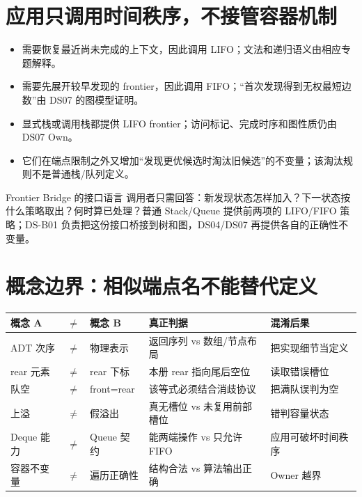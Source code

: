 \documentclass[UTF8,fontset=none,11pt,a4paper]{ctexart}
\begin{document}
\section{应用只调用时间秩序，不接管容器机制}
\begin{itemize}
\item {}需要恢复最近尚未完成的上下文，因此调用 LIFO；文法和递归语义由相应专题解释。
\item {}需要先展开较早发现的 frontier，因此调用 FIFO；“首次发现得到无权最短边数”由 DS07 的图模型证明。
\item {}显式栈或调用栈都提供 LIFO frontier；访问标记、完成时序和图性质仍由 DS07 Own。
\item {}它们在端点限制之外又增加“发现更优候选时淘汰旧候选”的不变量；该淘汰规则不是普通栈/队列定义。
\end{itemize}

\begin{methodbox}{Frontier Bridge 的接口语言}
调用者只需回答：新发现状态怎样加入？下一状态按什么策略取出？何时算已处理？普通 Stack/Queue 提供前两项的 LIFO/FIFO 策略；DS-B01 负责把这份接口桥接到树和图，DS04/DS07 再提供各自的正确性不变量。
\end{methodbox}

\section{概念边界：相似端点名不能替代定义}
\begin{center}\small
\begin{tabularx}{\linewidth}{L{1.8cm}C{0.35cm}L{1.8cm}YY}
\toprule
概念 A & $\neq$ & 概念 B & 真正判据 & 混淆后果\\
\midrule
ADT 次序 & $\neq$ & 物理表示 & 返回序列 vs 数组/节点布局 & 把实现细节当定义\\
rear 元素 & $\neq$ & rear 下标 & 本册 rear 指向尾后空位 & 读取错误槽位\\
队空 & $\neq$ & front=rear & 该等式必须结合消歧协议 & 把满队误判为空\\
上溢 & $\neq$ & 假溢出 & 真无槽位 vs 未复用前部槽位 & 错判容量状态\\
Deque 能力 & $\neq$ & Queue 契约 & 能两端操作 vs 只允许 FIFO & 应用可破坏时间秩序\\
容器不变量 & $\neq$ & 遍历正确性 & 结构合法 vs 算法输出正确 & Owner 越界\\
\bottomrule
\end{tabularx}
\end{center}
\end{document}
